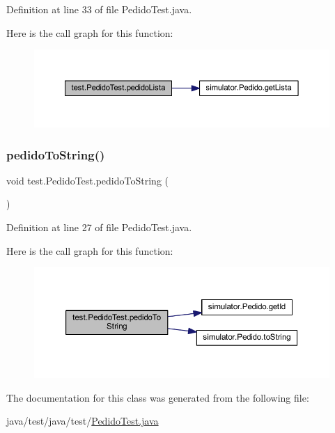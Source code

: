 Definition at line 33 of file Pedido\+Test.\+java.

Here is the call graph for this function\+:\nopagebreak
\begin{figure}[H]
\begin{center}
\leavevmode
\includegraphics[width=350pt]{classtest_1_1_pedido_test_a2685ac9664dc2e9bfba5d65b5b94bfbd_cgraph}
\end{center}
\end{figure}
\mbox{\label{classtest_1_1_pedido_test_a9e3efe0a23f91c6895ab6fe5da7621cb}} 
\subsubsection{\texorpdfstring{pedido\+To\+String()}{pedidoToString()}}
{\footnotesize\ttfamily void test.\+Pedido\+Test.\+pedido\+To\+String (\begin{DoxyParamCaption}{ }\end{DoxyParamCaption})}



Definition at line 27 of file Pedido\+Test.\+java.

Here is the call graph for this function\+:\nopagebreak
\begin{figure}[H]
\begin{center}
\leavevmode
\includegraphics[width=350pt]{classtest_1_1_pedido_test_a9e3efe0a23f91c6895ab6fe5da7621cb_cgraph}
\end{center}
\end{figure}


The documentation for this class was generated from the following file\+:\begin{DoxyCompactItemize}
\item 
java/test/java/test/\mbox{\hyperlink{_pedido_test_8java}{Pedido\+Test.\+java}}\end{DoxyCompactItemize}
